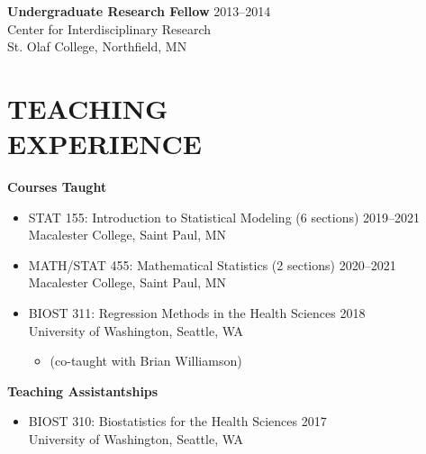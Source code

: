\documentclass[margin]{res}
\begin{document}
\begin{resume}
\textbf{Undergraduate Research Fellow} \hfill 2013--2014 \\
Center for Interdisciplinary Research \\
St. Olaf College, Northfield, MN \\

\section{TEACHING \\ EXPERIENCE}

\textbf{Courses Taught} \vspace{0.1cm}
\begin{itemize}
\item STAT 155: Introduction to Statistical Modeling (6 sections) \hfill 2019--2021 \\
Macalester College, Saint Paul, MN

\item MATH/STAT 455: Mathematical Statistics (2 sections) \hfill 2020--2021 \\
Macalester College, Saint Paul, MN

\item BIOST 311: Regression Methods in the Health Sciences \hfill  2018 \\
University of Washington, Seattle, WA \vspace{-0.2cm}
\begin{itemize} 
				\item[] (co-taught with Brian Williamson)
				\end{itemize}
\end{itemize} 

\newpage

\textbf{Teaching Assistantships} 
\begin{itemize}
\item BIOST 310: Biostatistics for the Health Sciences  \hfill  2017 \\
University of Washington, Seattle, WA \vspace{0.1cm}


\end{itemize}
\end{resume}
\end{document}
